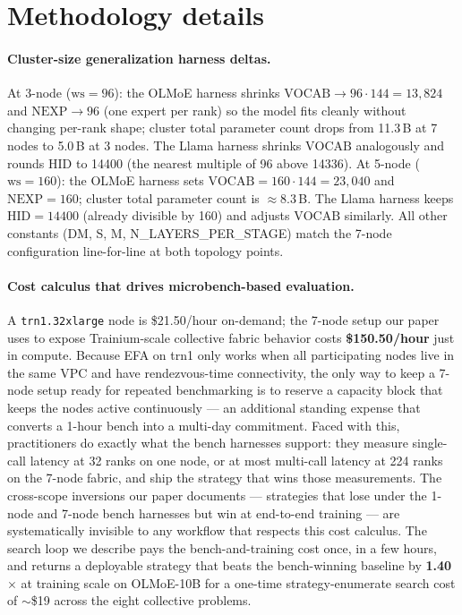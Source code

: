 \section{Methodology details}
\label{sec:methodology-details}

\paragraph{Cluster-size generalization harness deltas.}
\label{sec:3node-detail}
At 3-node ($\text{ws}{=}96$): the OLMoE harness shrinks
$\text{VOCAB} \to 96 \cdot 144 = 13{,}824$ and $\text{NEXP} \to 96$
(one expert per rank) so the model fits cleanly without changing
per-rank shape; cluster total parameter count drops from 11.3\,B
at 7 nodes to 5.0\,B at 3 nodes. The Llama harness shrinks
$\text{VOCAB}$ analogously and rounds $\text{HID}$ to 14400 (the
nearest multiple of 96 above 14336).
At 5-node ($\text{ws}{=}160$): the OLMoE harness sets
$\text{VOCAB} = 160 \cdot 144 = 23{,}040$ and $\text{NEXP} = 160$;
cluster total parameter count is $\approx$8.3\,B. The Llama harness
keeps $\text{HID}{=}14400$ (already divisible by 160) and adjusts
$\text{VOCAB}$ similarly. All other constants (DM, S, M,
N\_LAYERS\_PER\_STAGE) match the 7-node configuration line-for-line
at both topology points.

\paragraph{Cost calculus that drives microbench-based evaluation.}
A \texttt{trn1.32xlarge} node is \$21.50/hour on-demand; the 7-node
setup our paper uses to expose Trainium-scale collective fabric
behavior costs \textbf{\$150.50/hour} just in compute. Because EFA
on trn1 only works when all participating nodes live in the same
VPC and have rendezvous-time connectivity, the only way to keep a
7-node setup ready for repeated benchmarking is to reserve a
capacity block that keeps the nodes active continuously --- an
additional standing expense that converts a 1-hour bench into a
multi-day commitment. Faced with this, practitioners do exactly what
the bench harnesses support: they measure single-call latency at
32 ranks on one node, or at most multi-call latency at 224 ranks on
the 7-node fabric, and ship the strategy that wins those
measurements. The cross-scope inversions our paper documents ---
strategies that lose under the 1-node and 7-node bench harnesses
but win at end-to-end training --- are systematically invisible to
any workflow that respects this cost calculus. The search loop we
describe pays the bench-and-training cost once, in a few hours, and
returns a deployable strategy that beats the bench-winning
baseline by \textbf{1.40$\times$} at training scale on OLMoE-10B for
a one-time strategy-enumerate search cost of $\sim$\$19 across the
eight collective problems.


